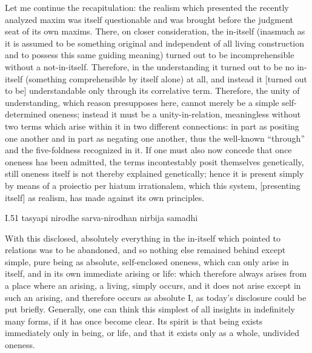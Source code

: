 Let me continue the recapitulation:
the realism which presented
the recently analyzed maxim was
itself questionable and was brought before
the judgment seat of its own maxims.
There, on closer consideration, the in-itself
(inasmuch as it is assumed to be something original
and independent of all living construction
and to possess this same guiding meaning)
turned out to be incomprehensible
without a not-in-itself.
Therefore, in the understanding
it turned out to be no in-itself
(something comprehensible by itself alone) at all,
and instead it [turned out to be] understandable
only through its correlative term.
Therefore, the unity of understanding,
which reason presupposes here,
cannot merely be a simple self-determined oneness;
instead it must be a unity-in-relation,
meaningless without two terms
which arise within it in two different connections:
in part as positing one another
and in part as negating one another,
thus the well-known “through” and
the five-foldness recognized in it.
If one must also now concede that
once oneness has been admitted,
the terms incontestably posit themselves genetically,
still oneness itself is not thereby explained genetically;
hence it is present simply by means of
a proiectio per hiatum irrationalem,
which this system, [presenting itself] as realism,
has made against its own principles.

I.51
tasyapi nirodhe sarva-nirodhan nirbija samadhi

With this disclosed, absolutely everything
in the in-itself which pointed to relations
was to be abandoned,
and so nothing else remained behind
except simple, pure being
as absolute, self-enclosed oneness,
which can only arise in itself,
and in its own immediate arising or life:
which therefore always arises
from a place where an arising,
a living, simply occurs, and
it does not arise except in such an arising,
and therefore occurs as absolute I,
as today’s disclosure could be put briefly.
Generally, one can think this simplest
of all insights in indefinitely many forms,
if it has once become clear.
Its spirit is that being exists
immediately only in being, or life,
and that it exists only
as a whole, undivided oneness.
